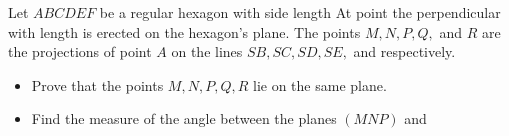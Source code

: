 Let $ABCDEF$ be a regular hexagon with side length  At point  the perpendicular  with length  is erected on the hexagon's plane. The points $M, N, P, Q,$ and $R$ are the projections of point $A$ on the lines $SB, SC, SD, SE,$ and  respectively.
\begin{itemize}
	\item Prove that the points $M, N, P, Q, R$ lie on the same plane.
	\item Find the measure of the angle between the planes $(MNP)$ and 
\end{itemize}
